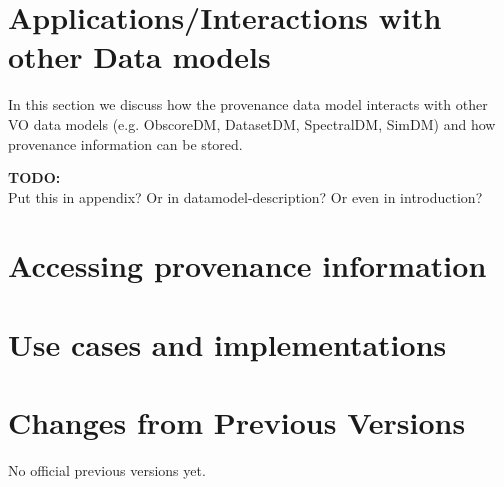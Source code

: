 \documentclass[11pt,a4paper]{ivoa}
\newcommand{\TODO}[1]{%
    \noindent%
    \colorbox{todocolor}{%
            \parbox{0.85\linewidth}{\sffamily \textbf{TODO:}\\
            #1}
    }%
    \vspace{2pt}

}
\begin{document}
\section{Applications/Interactions with other Data models}
In this section we discuss how the provenance data model interacts with
other VO data models (e.g. ObscoreDM, DatasetDM, SpectralDM, SimDM) and how provenance information can be stored.


\TODO{Put this in appendix? Or in datamodel-description? Or even in introduction?}


\section{Accessing provenance information}



\section{Use cases and implementations}\label{sec:usecases-implementations}



\appendix
\section{Changes from Previous Versions}
No official previous versions yet.



\end{document}
